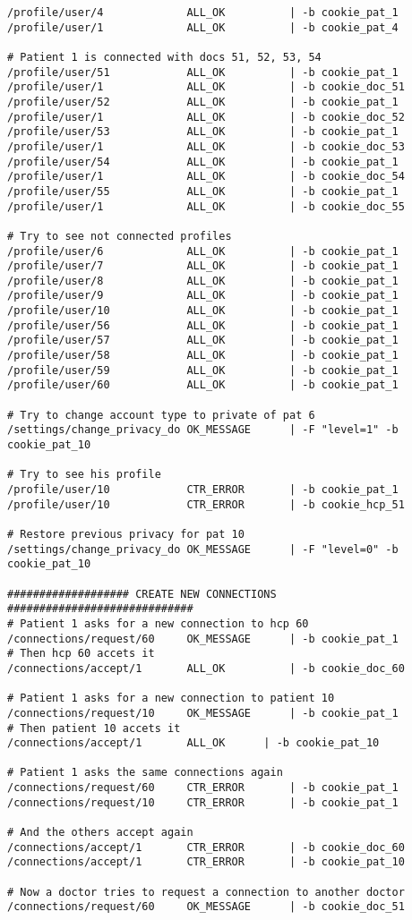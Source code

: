 \begin{verbatim}
/profile/user/4				ALL_OK			| -b cookie_pat_1
/profile/user/1				ALL_OK			| -b cookie_pat_4

# Patient 1 is connected with docs 51, 52, 53, 54
/profile/user/51			ALL_OK			| -b cookie_pat_1
/profile/user/1				ALL_OK			| -b cookie_doc_51
/profile/user/52			ALL_OK			| -b cookie_pat_1
/profile/user/1				ALL_OK			| -b cookie_doc_52
/profile/user/53			ALL_OK			| -b cookie_pat_1
/profile/user/1				ALL_OK			| -b cookie_doc_53
/profile/user/54			ALL_OK			| -b cookie_pat_1
/profile/user/1				ALL_OK			| -b cookie_doc_54
/profile/user/55			ALL_OK			| -b cookie_pat_1
/profile/user/1				ALL_OK			| -b cookie_doc_55

# Try to see not connected profiles
/profile/user/6				ALL_OK			| -b cookie_pat_1
/profile/user/7				ALL_OK			| -b cookie_pat_1
/profile/user/8				ALL_OK			| -b cookie_pat_1
/profile/user/9				ALL_OK			| -b cookie_pat_1
/profile/user/10			ALL_OK			| -b cookie_pat_1
/profile/user/56			ALL_OK			| -b cookie_pat_1
/profile/user/57			ALL_OK			| -b cookie_pat_1
/profile/user/58			ALL_OK			| -b cookie_pat_1
/profile/user/59			ALL_OK			| -b cookie_pat_1
/profile/user/60			ALL_OK			| -b cookie_pat_1

# Try to change account type to private of pat 6
/settings/change_privacy_do	OK_MESSAGE		| -F "level=1" -b cookie_pat_10

# Try to see his profile
/profile/user/10			CTR_ERROR		| -b cookie_pat_1
/profile/user/10			CTR_ERROR		| -b cookie_hcp_51

# Restore previous privacy for pat 10
/settings/change_privacy_do	OK_MESSAGE		| -F "level=0" -b cookie_pat_10

################### CREATE NEW CONNECTIONS #############################
# Patient 1 asks for a new connection to hcp 60
/connections/request/60		OK_MESSAGE		| -b cookie_pat_1
# Then hcp 60 accets it
/connections/accept/1		ALL_OK			| -b cookie_doc_60

# Patient 1 asks for a new connection to patient 10
/connections/request/10		OK_MESSAGE		| -b cookie_pat_1
# Then patient 10 accets it
/connections/accept/1		ALL_OK		| -b cookie_pat_10

# Patient 1 asks the same connections again
/connections/request/60		CTR_ERROR		| -b cookie_pat_1
/connections/request/10		CTR_ERROR		| -b cookie_pat_1

# And the others accept again
/connections/accept/1		CTR_ERROR		| -b cookie_doc_60
/connections/accept/1		CTR_ERROR		| -b cookie_pat_10

# Now a doctor tries to request a connection to another doctor
/connections/request/60		OK_MESSAGE		| -b cookie_doc_51


\end{verbatim}

